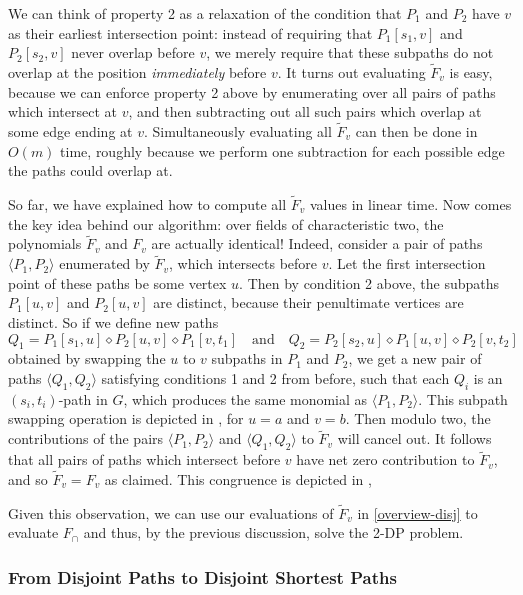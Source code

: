 \documentclass[11pt]{article}
\newcommand{\pair}[1]{\langle #1\rangle}
\newcommand{\dia}{\diamond}
\theoremstyle{definition}
\newcommand\nicole[1]{\textcolor{red}{Nicole says: #1}}
\begin{document}
We can think of property 2
as a relaxation of the condition that $P_1$ and $P_2$ have $v$ as their earliest intersection point: instead of requiring that $P_1[s_1,v]$ and $P_2[s_2,v]$ never overlap before $v$, we merely require that these subpaths do not overlap at the  position \emph{immediately} before $v$.
It turns out evaluating $\tilde{F}_v$ is easy, because we can enforce property 2 above by enumerating over all pairs of paths which intersect at $v$, and then subtracting out all such pairs  which overlap at some edge ending at $v$.
Simultaneously evaluating all $\tilde{F}_v$ can then be done in $O(m)$ time, roughly because we perform one subtraction for each possible edge the paths could overlap at.


So far, we have explained how to compute all $\tilde{F}_v$ values in linear time.
Now comes the key idea behind our algorithm: over fields of characteristic two,  the polynomials $\tilde{F}_v$ and $F_v$ are actually identical! 
Indeed, consider a pair of paths $\pair{P_1, P_2}$ enumerated by $\tilde{F}_v$, which intersects before $v$.
Let the first intersection point of these paths be some vertex $u$.
Then by condition 2 above, the subpaths $P_1[u,v]$ and $P_2[u,v]$ are distinct, because their penultimate vertices are distinct.
So if we define new paths 
    \[Q_1 = P_1[s_1,u]\dia P_2[u,v]\dia P_1[v,t_1]
    \quad\text{and}\quad 
    Q_2 = P_2[s_2,u]\dia P_1[u,v]\dia P_2[v,t_2]\]
obtained by swapping the $u$ to $v$ subpaths in $P_1$ and $P_2$, we get a new pair of paths $\pair{Q_1,Q_2}$ satisfying conditions 1 and 2 from before, such that each $Q_i$ is an $(s_i,t_i)$-path in $G$, which produces the same monomial as $\pair{P_1,P_2}$.
This subpath swapping operation is depicted in , for $u=a$ and $v=b$.
Then modulo two, the contributions of the pairs $\pair{P_1,P_2}$ and $\pair{Q_1,Q_2}$ to $\tilde{F}_v$ will cancel out.
It follows that all pairs of paths which intersect before $v$ have net zero contribution to  $\tilde{F}_v$, and so $\tilde{F}_v = F_v$ as claimed.
This congruence is depicted in ,



Given this observation, we can use our evaluations of $\tilde{F}_v$ in \cref{overview-disj} to evaluate $F_{\cap}$ and thus, by the previous discussion, solve the \textsf{2-DP} problem.

\subsubsection*{From Disjoint Paths to Disjoint Shortest Paths}
\end{document}
